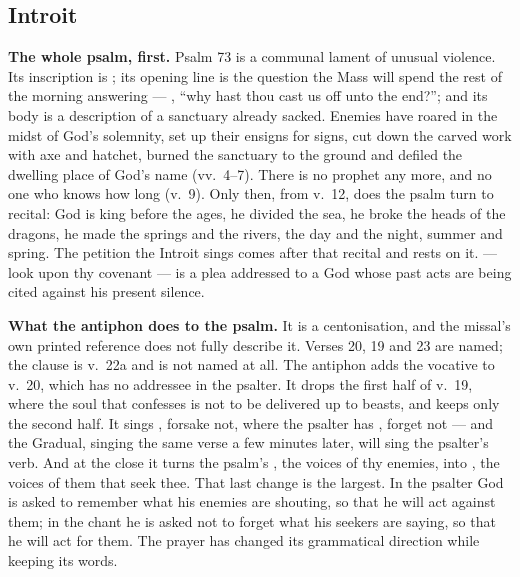 \elementguard
\subsection*{Introit }


\textbf{The whole psalm, first.} Psalm 73 is a communal lament of unusual
violence. Its inscription is ; its opening line is the
question the Mass will spend the rest of the morning answering --- , ``why hast thou cast us off unto the end?'';
and its body is a description of a sanctuary already sacked. Enemies have
roared in the midst of God's solemnity, set up their ensigns for signs, cut
down the carved work with axe and hatchet, burned the sanctuary to the ground
and defiled the dwelling place of God's name (vv.~4--7). There is no prophet
any more, and no one who knows how long (v.~9). Only then, from v.~12, does the
psalm turn to recital: God is king before the ages, he divided the sea, he
broke the heads of the dragons, he made the springs and the rivers, the day and
the night, summer and spring. The petition the Introit sings comes after that
recital and rests on it.  --- look upon thy
covenant --- is a plea addressed to a God whose past acts are being cited
against his present silence.

\textbf{What the antiphon does to the psalm.} It is a centonisation, and the
missal's own printed reference does not fully describe it. Verses 20, 19 and 23
are named; the clause  is v.~22a
and is not named at all. The antiphon adds the vocative  to
v.~20, which has no addressee in the psalter. It drops the first half of v.~19,
where the soul that confesses is not to be delivered up to beasts, and keeps
only the second half. It sings , forsake not, where the
psalter has , forget not --- and the Gradual, singing
the same verse a few minutes later, will sing the psalter's verb. And at the
close it turns the psalm's , the voices of thy
enemies, into , the voices of them that seek thee.
That last change is the largest. In the psalter God is asked to remember what
his enemies are shouting, so that he will act against them; in the chant he is
asked not to forget what his seekers are saying, so that he will act for them.
The prayer has changed its grammatical direction while keeping its words.

